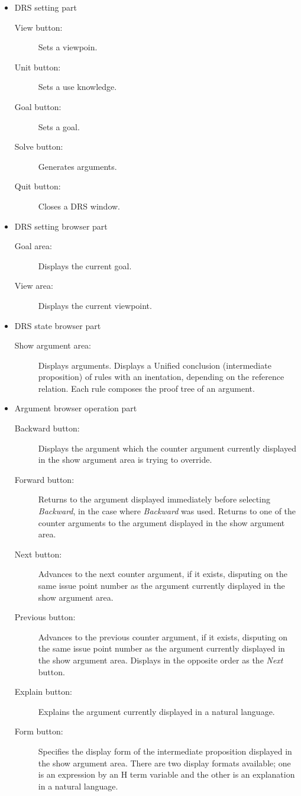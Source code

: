 \begin{itemize}

\item DRS setting part 
\begin{description}
\item[View button:] Sets a viewpoin.
\item[Unit button:] Sets a use knowledge.
\item[Goal button:] Sets a goal.
\item[Solve button:] Generates arguments.
\item[Quit  button:] Closes a DRS window.
\end{description}

\item DRS setting browser part
\begin{description}
\item[Goal area:] Displays the current goal.
\item[View area:] Displays the current viewpoint.
\end{description}

\item DRS state browser part
\begin{description}
\item[Show argument area:] Displays arguments.
Displays a Unified conclusion (intermediate proposition) of rules with an inentation, depending on the reference relation.
Each rule composes the proof tree of an argument.
\end{description}

\item{Argument browser operation part}
\begin{description}
\item[Backward button:] Displays the argument which the counter argument currently displayed in the show argument area is trying to override.
\item[Forward button:] Returns to the argument displayed immediately
  before selecting {\sl Backward}, in the case where {\sl Backward} was used.
Returns to one of the counter arguments to the argument displayed 
 in the show argument area.
\item[Next button:] Advances to the next counter argument, if it exists, disputing on the same issue point number as the argument currently displayed in the show argument area.
\item[Previous button:] Advances to the previous counter argument, if it exists, disputing on the same issue point number as the argument currently displayed in the show argument area.
Displays in the opposite order as the {\sl Next} button.
\item[Explain button:] Explains the argument currently displayed in a natural language.
\item[Form button:] Specifies the display form of the intermediate proposition displayed in the show argument area.
There are two display formats available; one is an expression by an H term variable and the other is an explanation in a natural language.
\end{description}

\end{itemize}

